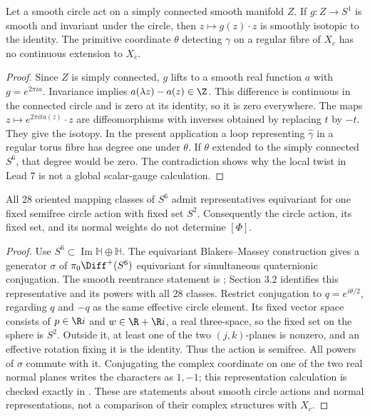 \begin{proposition}
Let a smooth circle act on a simply connected smooth manifold $Z$.
If $g:Z\to S^1$ is smooth and invariant under the circle, then
$z\mapsto g(z)\cdot z$ is smoothly isotopic to the identity.
The primitive coordinate $\theta$ detecting $\gamma$ on a regular
fibre of $X_c$ has no continuous extension to $X_c$.
\end{proposition}

\begin{proof}
Since $Z$ is simply connected, $g$ lifts to a smooth real function
$a$ with $g=e^{2\pi ia}$. Invariance implies
$a(\lambda z)-a(z)\in\Z$. This difference is continuous in the
connected circle and is zero at its identity, so it is zero
everywhere. The maps $z\mapsto e^{2\pi ita(z)}\cdot z$ are
diffeomorphisms with inverses obtained by replacing $t$ by $-t$.
They give the isotopy. In the present application a loop representing
$\widehat\gamma$ in a regular torus fibre has degree one under
$\theta$. If $\theta$ extended to the simply connected $S^6$,
that degree would be zero. The contradiction shows why the local
twist in Lead 7 is not a global scalar-gauge calculation.
\end{proof}

\begin{proposition}
All 28 oriented mapping classes of $S^6$ admit representatives
equivariant for one fixed semifree circle action with fixed set $S^2$.
Consequently the circle action, its fixed set, and its normal weights
do not determine $[\Phi]$.
\end{proposition}

\begin{proof}
Use $S^6\subset\operatorname{Im}\mathbb H\oplus\mathbb H$.
The equivariant Blakers--Massey construction gives a generator
$\sigma$ of $\pi_0\Diff^+(S^6)$ equivariant for simultaneous
quaternionic conjugation. The smooth reentrance statement is
\citet[Theorem 2.1]{DuranRigas2007}; Section 3.2 identifies this
representative and its powers with all 28 classes. Restrict
conjugation to $q=e^{i\theta/2}$, regarding $q$ and $-q$ as the
same effective circle element. Its fixed vector space consists of
$p\in\R i$ and $w\in\R+\R i$, a real three-space, so the
fixed set on the sphere is $S^2$. Outside it, at least one of the
two $(j,k)$-planes is nonzero, and an effective rotation fixing it
is the identity. Thus the action is semifree. All powers of
$\sigma$ commute with it. Conjugating the complex coordinate on
one of the two real normal planes writes the characters as
$1,-1$; this representation calculation is checked exactly in
. These are statements about smooth circle
actions and normal representations, not a comparison of their
complex structures with $X_c$.
\end{proof}

